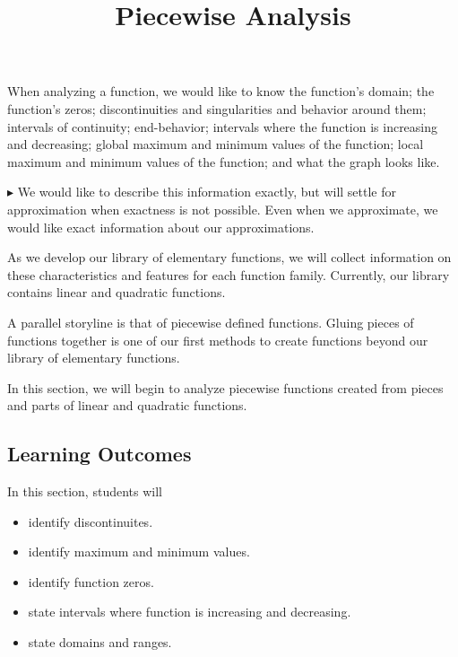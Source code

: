 \documentclass{ximera}
\title{Piecewise Analysis}
\begin{document}
\begin{abstract}
\end{abstract}
\maketitle




When analyzing a function, we would like to know the function's domain; the function's zeros; discontinuities and singularities and behavior around them; intervals of continuity; end-behavior; intervals where the function is increasing and decreasing; global maximum and minimum values of the function; local maximum and minimum values of the function; and what the graph looks like. 




$\blacktriangleright$ We would like to describe this information exactly, but will settle for approximation when exactness is not possible. Even when we approximate, we would like exact information about our approximations.


As we develop our library of elementary functions, we will collect information on these characteristics and features for each function family.  Currently, our library contains linear and quadratic functions.  

A parallel storyline is that of piecewise defined functions.  Gluing pieces of functions together is one of our first methods to create functions beyond our library of elementary functions.

In this section, we will begin to analyze piecewise functions created from pieces and parts of linear and quadratic functions.
















\subsection*{Learning Outcomes}


\begin{sectionOutcomes}
In this section, students will 

\begin{itemize}
\item identify discontinuites.
\item identify maximum and minimum values.
\item identify function zeros.
\item state intervals where function is increasing and decreasing.
\item state domains and ranges.
\end{itemize}
\end{sectionOutcomes}
\end{document}

